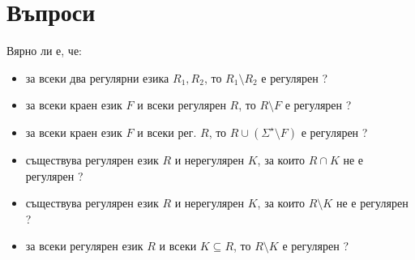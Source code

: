       
      


\newpage
\section{Въпроси}

Вярно ли е, че:
\begin{itemize}
\item
  за всеки два регулярни езика $R_1, R_2$, то $R_1 \setminus R_2$ е регулярен ?
\item
  за всеки краен език $F$ и всеки регулярен $R$, то $R\setminus F$ е регулярен ?
\item
  за всеки краен език $F$ и всеки рег. $R$, то $R\cup (\Sigma^\star \setminus F)$ е регулярен ?
\item
  съществува регулярен език $R$ и нерегулярен $K$, за които $R\cap K$ не е регулярен ?
\item
  съществува регулярен език $R$ и нерегулярен $K$, за които $R\setminus K$ не е регулярен ?
\item
  за всеки регулярен език $R$ и всеки $K \subseteq R$, то $R\setminus K$ е регулярен ?
\end{itemize}




